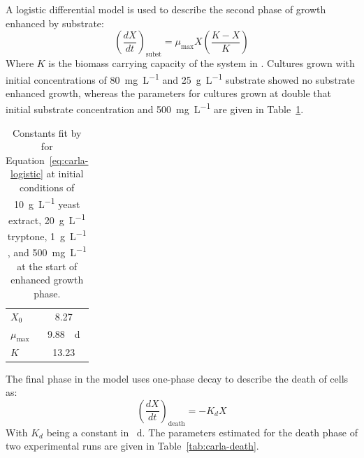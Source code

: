 A logistic differential model is used to describe the second phase of growth enhanced by substrate: 
\begin{equation}
	\left(\frac{dX}{dt}\right)_\textrm{subst} = \mu_\textrm{max} X \left(\frac{K- X}{K}\right) \label{eq:carla-logistic}
\end{equation}
Where $ K $ is the biomass carrying capacity of the system in \si{\au}. Cultures grown with initial concentrations of \SI{80}{\milli\gram\per\liter}  and \SI{25}{\gram\per\liter} substrate showed no substrate enhanced growth, whereas the parameters for cultures grown at double that initial substrate concentration and \SI{500}{\milli\gram\per\liter}   are given in Table~\ref{tab:carla-logistic}.

\begin{table}[htbp!]
	\caption{Constants fit by \textcite{Horstman2019} for Equation~\ref{eq:carla-logistic} at initial conditions of \SI{10}{\gram\per\liter} yeast extract, \SI{20}{\gram\per\liter} tryptone, \SI{1}{\gram\per\liter} , and \SI{500}{\milli\gram\per\liter}  at the start of enhanced growth phase.}
	\label{tab:carla-logistic}
	\centering
	\begin{small}
	\begin{tabular}{lc}
		\toprule
		$ X_0 $ & \SI{8.27}{\au}  \\
		$ \mu_\textrm{max} $ & \SI{9.88}{\per\day} \\
		$ K $ & \SI{13.23}{\au}  \\
		\bottomrule
	\end{tabular}
\end{small}
\end{table}

The final phase in the model uses one-phase decay to describe the death of cells as:
\begin{equation}
	\left(\frac{dX}{dt}\right)_\textrm{death} = - K_d X \label{eq:carla-death}
\end{equation}
With $ K_d $ being a constant in \si{\per\day}. The parameters estimated for the death phase of two experimental runs are given in Table~\ref{tab:carla-death}.

